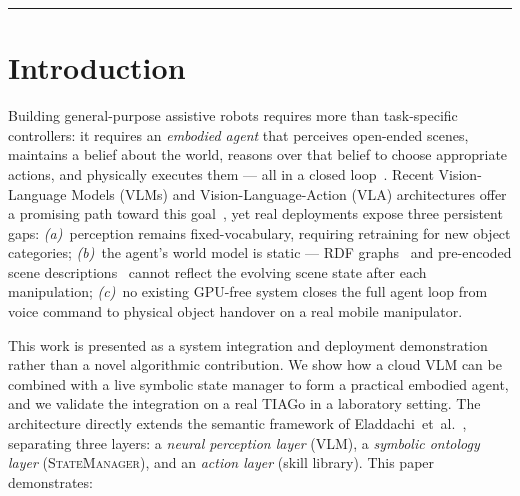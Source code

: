 \documentclass[twocolumn,10pt]{article}
\newcommand{\SM}{\textsc{StateManager}}
\begin{document}
\vspace{3pt}\noindent\rule{\columnwidth}{0.4pt}\vspace{2pt}

\section{Introduction}
\label{sec:intro}

Building general-purpose assistive robots requires more than task-specific
controllers: it requires an \textit{embodied agent} that perceives
open-ended scenes, maintains a belief about the world, reasons over that
belief to choose appropriate actions, and physically executes them —
all in a closed loop~\cite{ahn2022saycan}.
Recent Vision-Language Models (VLMs) and Vision-Language-Action (VLA)
architectures offer a promising path toward this goal~\cite{hu2023vila},
yet real deployments expose three persistent gaps:
\textit{(a)}~perception remains fixed-vocabulary, requiring retraining
for new object categories;
\textit{(b)}~the agent's world model is static — RDF
graphs~\cite{eladdachi2025llm} and pre-encoded scene
descriptions~\cite{rana2023sayplan} cannot reflect the evolving scene state
after each manipulation;
\textit{(c)}~no existing GPU-free system closes the full agent loop from
voice command to physical object handover on a real mobile manipulator.

This work is presented as a system integration and deployment demonstration
rather than a novel algorithmic contribution.
We show how a cloud VLM can be combined with a live symbolic state manager
to form a practical embodied agent, and we validate the integration on a
real TIAGo in a laboratory setting.
The architecture directly extends the semantic framework of
Eladdachi~et~al.~\cite{eladdachi2025llm}, separating three layers:
a \textit{neural perception layer} (VLM), a \textit{symbolic ontology layer}
(\SM), and an \textit{action layer} (skill library).
This paper demonstrates:
\end{document}
